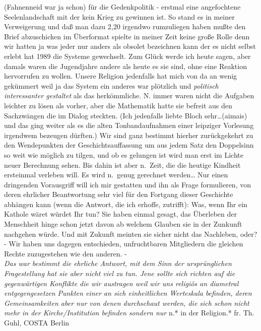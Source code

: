 \documentclass[
]{article}
\begin{document}
(Fahnenneid war ja schon) für die Gedenkpolitik - erstmal eine
angefochtene Seelenlandschaft mit der kein Krieg zu gewinnen ist. So
stand es in meiner Verweigerung und daß man dazu 2,20 irgendwo
rumzuliegen haben mußte den Brief abzuschicken im Überformat spielte in
meiner Zeit keine große Rolle denn wir hatten ja was jeder nur anders
als obsolet bezeichnen kann der es nicht selbst erlebt hat 1989 die
Systeme gewechselt. Zum Glück werde ich heute sagen, aber damals waren
die Jugendjahre andere als heute es sie sind, ohne eine Reaktion
hervorrufen zu wollen. Unsere Religion jedenfalls hat mich von da an
wenig gekümmert weil ja das System ein anderes war plötzlich und
\emph{politisch interessanter gestaltet} als das herkömmliche. N. immer
waren nicht die Aufgaben leichter zu lösen als vorher, aber die
Mathematik hatte sie befreit aus den Sachzwängen die im Dialog steckten.
(Ich jedenfalls liebte Bloch sehr\ldots(aimais) und das ging weiter als
es die alten Tonbandaufnahmen einer leipziger Vorlesung irgendwem
bezeugen dürften.) Wir sind ganz bestimmt hierher zurückgekehrt zu den
Wendepunkten der Geschichtsauffassung um aus jedem Satz den Doppelsinn
so weit wie möglich zu tilgen, und ob es gelungen ist wird man erst im
Lichte neuer Berechnung sehen. Bis dahin ist aber n.~Zeit, die die
heutige Kindheit ersteinmal verleben will. Es wird n.~genug gerechnet
werden\ldots{} Nur einen dringenden Vorausgriff will ich mir gestatten
und ihn als Frage formulieren, von deren ehrlicher Beantwortung sehr
viel für den Fortgang dieser Geschichte abhängen kann (wenn die Antwort,
die ich erhoffe, zutrifft): Was, wenn Ihr ein Kathole wäret würdet Ihr
tun? Sie haben einmal gesagt, das Überleben der Menschheit hinge schon
jetzt davon ab welchem Glauben sie in der Zunkunft nachgehen würde. Und
mit Zukunft meinten sie sicher nicht das Nachleben, oder? - Wir haben
uns dagegen entschieden, unfruchtbaren Mitgliedern die gleichen Rechte
zuzugestehen wie den anderen. -\\
\emph{Das war bestimmt die ehrliche Antwort, mit dem Sinn der
ursprünglichen Fragestellung hat sie aber nicht viel zu tun. Jene sollte
sich richten auf die gegenwärtigen Konflikte die wir austragen weil wir
uns religiös an diametral entgegengesetzen Punkten einer an sich
einheitlichen Werteskala befinden, deren Gemeinsamkeiten aber nur von
denen durchschaut werden, die sich schon nicht mehr in der
Kirche/Institution befinden sondern nur }n.* in der Religion.* fr. Th.
Guhl, COSTA Berlin
\end{document}
